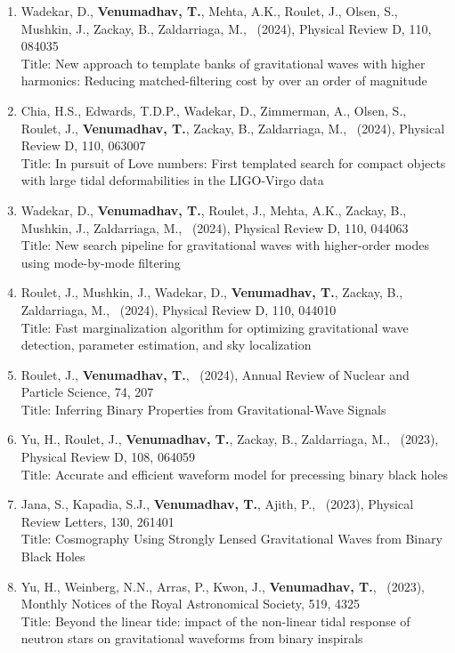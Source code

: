 \documentclass{article}
\newlength{\cvindent}
\newenvironment{cvlist}{%
  \begin{list}{}{%
    \setlength{\leftmargin}{\cvindent}%
    \setlength{\rightmargin}{0pt}%
    \setlength{\topsep}{0pt}%
    \setlength{\partopsep}{0pt}%
    \setlength{\parsep}{0pt}%
    \setlength{\itemsep}{0pt}%
  }%
  \item\relax
}{%
  \end{list}
}
\begin{document}
\begin{cvlist}
\begin{enumerate}[leftmargin=*,itemsep=0.32em,topsep=0.3em]
\item Wadekar, D., \textbf{Venumadhav, T.}, Mehta, A.K., Roulet, J., Olsen, S., Mushkin, J., Zackay, B., Zaldarriaga, M., \ (2024), Physical Review D, 110, 084035 \\
Title: New approach to template banks of gravitational waves with higher harmonics: Reducing matched-filtering cost by over an order of magnitude
\item Chia, H.S., Edwards, T.D.P., Wadekar, D., Zimmerman, A., Olsen, S., Roulet, J., \textbf{Venumadhav, T.}, Zackay, B., Zaldarriaga, M., \ (2024), Physical Review D, 110, 063007 \\
Title: In pursuit of Love numbers: First templated search for compact objects with large tidal deformabilities in the LIGO-Virgo data
\item Wadekar, D., \textbf{Venumadhav, T.}, Roulet, J., Mehta, A.K., Zackay, B., Mushkin, J., Zaldarriaga, M., \ (2024), Physical Review D, 110, 044063 \\
Title: New search pipeline for gravitational waves with higher-order modes using mode-by-mode filtering
\item Roulet, J., Mushkin, J., Wadekar, D., \textbf{Venumadhav, T.}, Zackay, B., Zaldarriaga, M., \ (2024), Physical Review D, 110, 044010 \\
Title: Fast marginalization algorithm for optimizing gravitational wave detection, parameter estimation, and sky localization
\item Roulet, J., \textbf{Venumadhav, T.}, \ (2024), Annual Review of Nuclear and Particle Science, 74, 207 \\
Title: Inferring Binary Properties from Gravitational-Wave Signals
\item Yu, H., Roulet, J., \textbf{Venumadhav, T.}, Zackay, B., Zaldarriaga, M., \ (2023), Physical Review D, 108, 064059 \\
Title: Accurate and efficient waveform model for precessing binary black holes
\item Jana, S., Kapadia, S.J., \textbf{Venumadhav, T.}, Ajith, P., \ (2023), Physical Review Letters, 130, 261401 \\
Title: Cosmography Using Strongly Lensed Gravitational Waves from Binary Black Holes
\item Yu, H., Weinberg, N.N., Arras, P., Kwon, J., \textbf{Venumadhav, T.}, \ (2023), Monthly Notices of the Royal Astronomical Society, 519, 4325 \\
Title: Beyond the linear tide: impact of the non-linear tidal response of neutron stars on gravitational waveforms from binary inspirals

\end{enumerate}
\end{cvlist}
\end{document}
